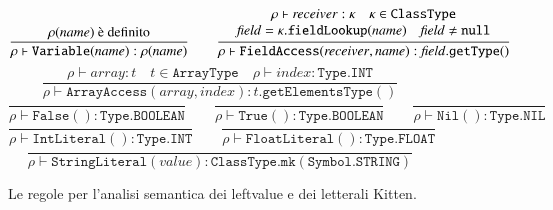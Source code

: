 \begin{figure}[th]
{\small
  \[
    \frac{\rho(\mathit{name})\text{ \`e definito}}
         {\rho\vdash\mathtt{Variable(\mathit{name})}:\rho(\mathit{name})}\qquad
    \frac{\begin{array}{c}
      \rho\vdash\mathit{receiver}:\kappa\quad\kappa\in\mathtt{ClassType}\\
      \mathit{field}=\kappa\mathtt{.fieldLookup(\mathit{name})}\quad
        \mathit{field}\not=\mathtt{null}
       \end{array}}
         {\rho\vdash\mathtt{FieldAccess(\mathit{receiver},\mathit{name})}:
          \mathit{field}\mathtt{.getType()}}
  \]
  \[
    \frac{\rho\vdash\mathit{array}:t\quad t\in\mathtt{ArrayType}\quad
          \rho\vdash\mathit{index}:\mathtt{Type.INT}}
         {\rho\vdash\mathtt{ArrayAccess(\mathit{array},\mathit{index})}:
          t\mathtt{.getElementsType()}}
  \]
  \[
    \frac{}
         {\rho\vdash\mathtt{False()}:\mathtt{Type.BOOLEAN}}\qquad
    \frac{}
         {\rho\vdash\mathtt{True()}:\mathtt{Type.BOOLEAN}}\qquad
    \frac{}
         {\rho\vdash\mathtt{Nil()}:\mathtt{Type.NIL}}
  \]
  \[
    \frac{}
         {\rho\vdash\mathtt{IntLiteral()}:\mathtt{Type.INT}}\qquad
    \frac{}
         {\rho\vdash\mathtt{FloatLiteral()}:\mathtt{Type.FLOAT}}
  \]
  \[
    \frac{}
         {\rho\vdash\mathtt{StringLiteral(\mathit{value})}:
         \mathtt{ClassType.mk(Symbol.STRING)}}
  \]
}
\caption{Le regole per l'analisi semantica dei leftvalue e dei letterali
         Kitten.}
  \label{fig:analysis_expressions1}
\end{figure}
%
